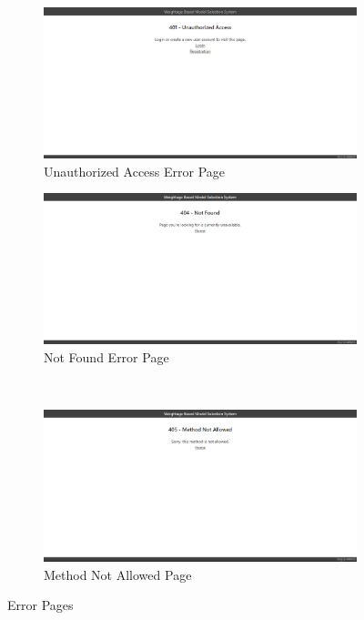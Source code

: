 \begin{figure}[H]
  \begin{subfigure}{.5\columnwidth}
    \centering
    \includegraphics[width=0.9\columnwidth]{media/website/pages/401.png}
    \caption{Unauthorized Access Error Page}
    \label{fig:401_page}
  \end{subfigure}%
  \begin{subfigure}{.5\columnwidth}
    \centering
    \includegraphics[width=0.9\columnwidth]{media/website/pages/404.png}
    \caption{Not Found Error Page}
    \label{fig:404_page}
  \end{subfigure}\\%
  \begin{subfigure}{.5\columnwidth}
    \centering
    \includegraphics[width=0.9\columnwidth]{media/website/pages/405.png}
    \caption{Method Not Allowed Page}
    \label{fig:405_page}
  \end{subfigure}%
  \caption{Error Pages}\label{fig:error_pages}
\end{figure}

